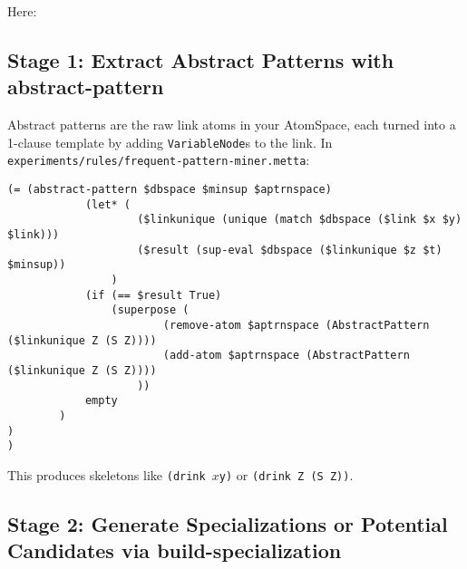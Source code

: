 \documentclass{article}
\begin{document}
Here:\\


\subsection{Stage 1: Extract Abstract Patterns with abstract-pattern}

Abstract patterns are the raw link atoms in your AtomSpace, each turned into a 1-clause template by adding \texttt{VariableNode}s to the link.  In \texttt{experiments/rules/frequent-pattern-miner.metta}:

\begin{verbatim}
(= (abstract-pattern $dbspace $minsup $aptrnspace)
            (let* (
                    ($linkunique (unique (match $dbspace ($link $x $y) $link)))
                    ($result (sup-eval $dbspace ($linkunique $z $t) $minsup))
                )
            (if (== $result True)
                (superpose (
                        (remove-atom $aptrnspace (AbstractPattern ($linkunique Z (S Z))))
                        (add-atom $aptrnspace (AbstractPattern ($linkunique Z (S Z))))
                    ))
            empty
        )
)
)
\end{verbatim}

This produces skeletons like \texttt{(drink $x $y)} or \texttt{(drink Z (S Z))}.

\subsection{Stage 2: Generate Specializations or Potential Candidates via build-specialization}
\end{document}
